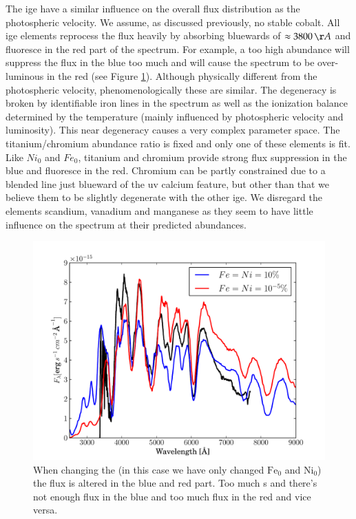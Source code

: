 The \gls{ige} have a similar influence on the overall flux distribution as the photospheric velocity. 
We assume, as discussed previously, no stable cobalt. All \gls{ige} elements reprocess the flux heavily by absorbing bluewards of $\approx 3800\,\AA$ and fluoresce in the red part of the spectrum. For example, a too high abundance will suppress the flux in the blue too much and will cause the spectrum to be over-luminous in the red (see Figure \ref{fig:sn2002bo_ige_offset}). Although physically different from the photospheric velocity, phenomenologically these are similar. The degeneracy is broken by identifiable iron lines in the spectrum as well as the ionization balance determined by the temperature (mainly influenced by photospheric velocity and luminosity). This near degeneracy causes a very complex parameter space. The titanium/chromium abundance ratio is fixed and only one of these elements is fit. Like $Ni_0$ and $Fe_0$, titanium and chromium provide strong flux suppression in the blue and fluoresce in the red. Chromium can be partly constrained due to a blended line just blueward of the \gls{uv} calcium feature, but other than that we believe them to be slightly degenerate with the other \gls{ige}. We disregard the elements scandium, vanadium and  manganese as they seem to have little influence on the spectrum at their predicted abundances.

\begin{figure}[tb] %
   \centering
   \includegraphics[width=\textwidth, trim=0 0 1cm 0, clip]{chapter_dalek/plots/bf2002bo-10_ige.pdf} 
   \caption[Effect of iron group elements on MLMC fit]{When changing the  (in this case we have only changed $\textrm{Fe}_0$ and $\textrm{Ni}_0$) the flux is altered in the blue and red part. Too much s and there's not enough flux in the blue and too much flux in the red and vice versa.}
   \label{fig:sn2002bo_ige_offset}
\end{figure}

